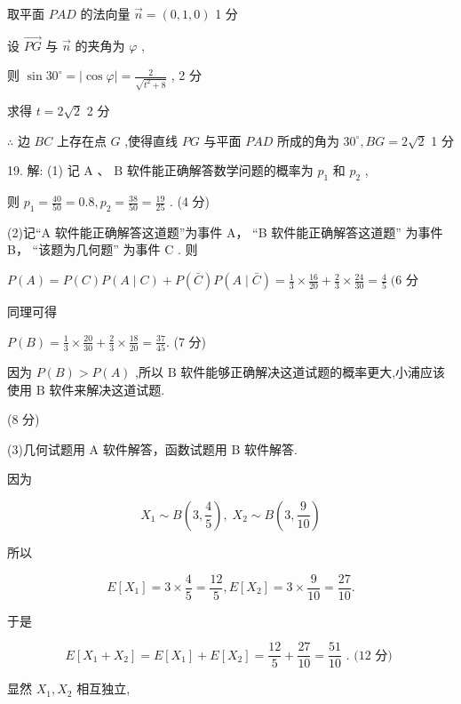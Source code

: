 \documentclass[10pt]{article}
\begin{document}
取平面 \({PAD}\) 的法向量 \(\overrightarrow{n} = \left( {0,1,0}\right)\) 1 分

设 \(\overrightarrow{PG}\) 与 \(\overrightarrow{n}\) 的夹角为 \(\varphi\) ,

则 \(\sin {30}^{ \circ  } = \left| {\cos \varphi }\right|  = \frac{2}{\sqrt{{t}^{2} + 8}}\) , 2 分

求得 \(t = 2\sqrt{2}\) 2 分

\(\therefore\) 边 \({BC}\) 上存在点 \(G\) ,使得直线 \({PG}\) 与平面 \({PAD}\) 所成的角为 \({30}^{ \circ  },{BG} = 2\sqrt{2}\) 1 分

19. 解: (1) 记 \(\mathrm{A}\) 、 \(\mathrm{B}\) 软件能正确解答数学问题的概率为 \({p}_{1}\) 和 \({p}_{2}\) ,

则 \({p}_{1} = \frac{40}{50} = {0.8},{p}_{2} = \frac{38}{50} = \frac{19}{25}\) . (4 分)

(2)记“A 软件能正确解答这道题”为事件 A， “B 软件能正确解答这道题” 为事件 B， “该题为几何题” 为事件 \(\mathrm{C}\) . 则

\(P\left( A\right)  = P\left( C\right) P\left( {A \mid  C}\right)  + P\left( \bar{C}\right) P\left( {A \mid  \bar{C}}\right)  = \frac{1}{3} \times  \frac{16}{20} + \frac{2}{3} \times  \frac{24}{30} = \frac{4}{5}\;(6\) 分

同理可得

\(P\left( B\right)  = \frac{1}{3} \times  \frac{20}{30} + \frac{2}{3} \times  \frac{18}{20} = \frac{37}{45}.\) (7 分)

因为 \(P\left( B\right)  > P\left( A\right)\) ,所以 \(\mathrm{B}\) 软件能够正确解决这道试题的概率更大,小浦应该使用 \(\mathrm{B}\) 软件来解决这道试题.

(8 分)

(3)几何试题用 A 软件解答，函数试题用 B 软件解答.

因为

\[
{X}_{1} \sim  B\left( {3,\frac{4}{5}}\right) ,\;{X}_{2} \sim  B\left( {3,\frac{9}{10}}\right)
\]

所以

\[
E\left\lbrack  {X}_{1}\right\rbrack   = 3 \times  \frac{4}{5} = \frac{12}{5},E\left\lbrack  {X}_{2}\right\rbrack   = 3 \times  \frac{9}{10} = \frac{27}{10}.
\]

于是

\[
E\left\lbrack  {{X}_{1} + {X}_{2}}\right\rbrack   = E\left\lbrack  {X}_{1}\right\rbrack   + E\left\lbrack  {X}_{2}\right\rbrack   = \frac{12}{5} + \frac{27}{10} = \frac{51}{10}\text{ . (12 分) }
\]

显然 \({X}_{1},{X}_{2}\) 相互独立,
\end{document}
